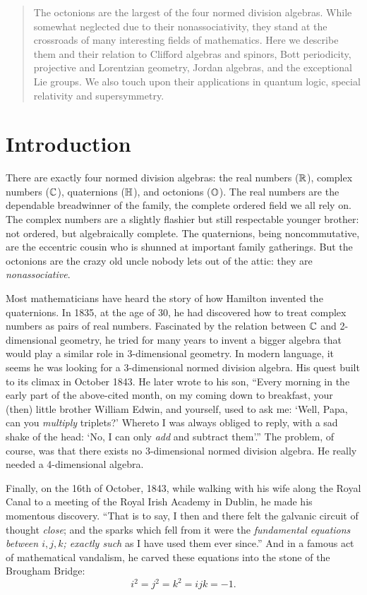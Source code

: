 \begin{abstract} 
\noindent  
The octonions are the largest of the four normed division algebras.
While somewhat neglected due to their nonassociativity, they stand at
the crossroads of many interesting fields of mathematics.  Here we
describe them and their relation to Clifford algebras and spinors, Bott
periodicity, projective and Lorentzian geometry, Jordan algebras, and
the exceptional Lie groups.  We also touch upon their applications in
quantum logic, special relativity and supersymmetry. 
\end{abstract}

\section{Introduction}   
   
There are exactly four normed division algebras: the real numbers  
(${\mathbb R}$), complex numbers (${\mathbb C}$), quaternions (${\mathbb H}$), and octonions  
(${\mathbb O}$).  The real numbers are the dependable breadwinner of the family,  
the complete ordered field we all rely on.  The complex numbers are a  
slightly flashier but still respectable younger brother: not ordered,  
but algebraically complete.  The quaternions, being noncommutative, are  
the eccentric cousin who is shunned at important family gatherings.  But  
the octonions are the crazy old uncle nobody lets out of the attic: they  
are {\it nonassociative}.  
   
Most mathematicians have heard the story of how Hamilton invented the   
quaternions.  In 1835, at the age of 30, he had discovered how to treat   
complex numbers as pairs of real numbers.   Fascinated by the relation   
between ${\mathbb C}$ and 2-dimensional geometry, he tried for many years to   
invent a bigger algebra that would play a similar role in 3-dimensional   
geometry.  In modern language, it seems he was looking for a 3-dimensional   
normed division algebra.  His quest built to its climax in October 1843.   
He later wrote to his son, ``Every morning in the early part of the   
above-cited month, on my coming down to breakfast, your (then) little   
brother William Edwin, and yourself, used to ask me: `Well, Papa, can you   
{\it multiply} triplets?'  Whereto I was always obliged to reply, with a sad   
shake of the head: `No, I can only {\it add} and subtract them'.''     
The problem, of course, was that there exists no 3-dimensional normed    
division algebra.  He really needed a 4-dimensional algebra.   
   
Finally, on the 16th of October, 1843, while walking with his wife along   
the Royal Canal to a meeting of the Royal Irish Academy in Dublin, he made    
his momentous discovery.  ``That is to say, I then and there felt the    
galvanic circuit of thought {\it close}; and the sparks which fell from it    
were the {\it fundamental equations between $i,j,k$; exactly such} as I have    
used them ever since.''  And in a famous act of mathematical vandalism, he   
carved these equations into the stone of the Brougham Bridge:    
\[    i^2 = j^2 = k^2 = ijk = -1 .\]    
   
